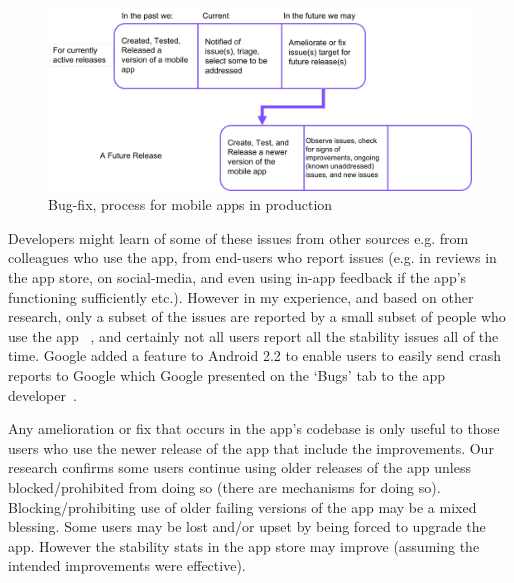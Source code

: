 \begin{figure} %
    \includegraphics[width=\linewidth]{images/my/production-bug-fix-process-for-mobile-apps.pdf}
    \caption{Bug-fix, process for mobile apps in production}
    \label{fig:my:bug-fix-process-for-mobile-apps-in-prod}
\end{figure}


Developers might learn of some of these issues from other sources e.g. from colleagues who use the app, from end-users who report issues (e.g. in reviews in the app store, on social-media, and even using in-app feedback if the app's functioning sufficiently etc.). 
However in my experience, and based on other research, only a subset of the issues are reported by a small subset of people who use the app~ %
, and certainly not all users report all the stability issues all of the time. Google added a feature to Android 2.2 to enable users to easily send crash reports to Google which Google presented on the `Bugs' tab to the app developer~.

Any amelioration or fix that occurs in the app's codebase is only useful to those users who use the newer release of the app that include the improvements. Our research confirms some users continue using older releases of the app unless blocked/prohibited from doing so (there are mechanisms for doing so). Blocking/prohibiting use of older failing versions of the app may be a mixed blessing. Some users may be lost and/or upset by being forced to upgrade the app. However the stability stats in the app store may improve (assuming the intended improvements were effective).



